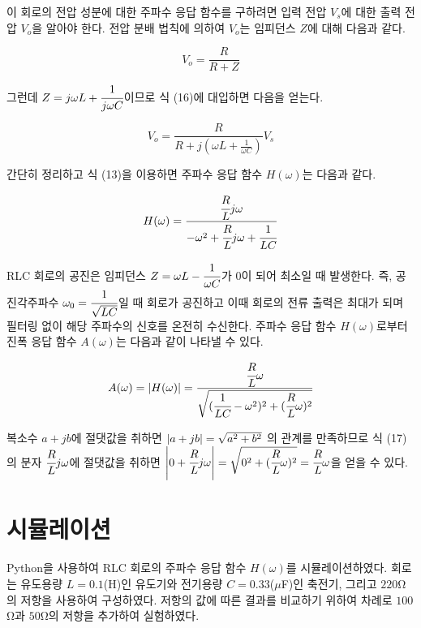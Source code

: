 \documentclass{article}
\begin{document}
이 회로의 전압 성분에 대한 주파수 응답 함수를 구하려면 입력 전압 $V_s$에 대한 출력 전압 $V_o$을 알아야 한다. 전압 분배 법칙에 의하여 $V_o$는 임피던스 $Z$에 대해 다음과 같다.

\begin{equation}
    V_o=\frac{R}{R+Z}
\end{equation}

그런데 $Z=j\omega L+\cfrac{1}{j\omega C}$이므로 식 (16)에 대입하면 다음을 얻는다.

\begin{equation}
    V_o=\frac{R}{R+j(\omega L+\frac{1}{\omega C})}V_s
\end{equation}

간단히 정리하고 식 (13)을 이용하면 주파수 응답 함수 $H(\omega)$는 다음과 같다.

\begin{equation}
    H(\omega)=\frac{\cfrac{R}{L}j\omega}{-\omega^2+\cfrac{R}{L}j\omega+\cfrac{1}{LC}}
\end{equation}

RLC 회로의 공진은 임피던스 $Z=\omega L-\cfrac{1}{\omega C}$가 0이 되어 최소일 때 발생한다. 즉, 공진각주파수 $\omega_0=\cfrac{1}{\sqrt{LC}}$일 때 회로가 공진하고 이때 회로의 전류 출력은 최대가 되며 필터링 없이 해당 주파수의 신호를 온전히 수신한다. 주파수 응답 함수 $H(\omega)$로부터 진폭 응답 함수 $A(\omega)$는 다음과 같이 나타낼 수 있다.

\begin{equation}
    A(\omega)=\abs{H(\omega)}=\frac{\cfrac{R}{L}\omega}{\sqrt{(\cfrac{1}{LC}-\omega^2)^2+(\cfrac{R}{L}\omega)^2}}
\end{equation}

복소수 $a+jb$에 절댓값을 취하면 $\abs{a+jb}=\sqrt{a^2+b^2}$ 의 관계를 만족하므로 식 (17)의 분자 $\cfrac{R}{L}j\omega$에 절댓값을 취하면 $\abs{0+\cfrac{R}{L}j\omega}=\sqrt{0^2+(\cfrac{R}{L}\omega)^2}=\cfrac{R}{L}\omega$을 얻을 수 있다.

\section{시뮬레이션}
Python을 사용하여 RLC 회로의 주파수 응답 함수 $H(\omega)$를 시뮬레이션하였다. 회로는 유도용량 $L=0.1$(H)인 유도기와 전기용량 $C=0.33$($\mu$F)인 축전기, 그리고 $220$Ω의 저항을 사용하여 구성하였다. 저항의 값에 따른 결과를 비교하기 위하여 차례로 $100$Ω과 $50$Ω의 저항을 추가하여 실험하였다.
\end{document}
